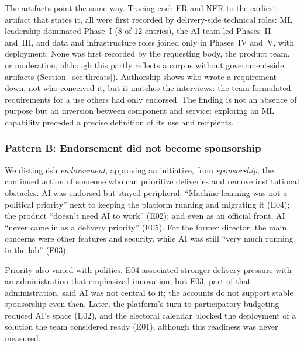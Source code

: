 \documentclass[sigconf,nonacm]{acmart}
\begin{document}
The artifacts point the same way. Tracing each FR and NFR to the earliest artifact that states it, all were first recorded by delivery-side technical roles: ML leadership dominated Phase~I (8 of 12 entries), the AI team led Phases~II and~III, and data and infrastructure roles joined only in Phases~IV and~V, with deployment. None was first recorded by the requesting body, the product team, or moderation, although this partly reflects a corpus without government-side artifacts (Section~\ref{sec:threats}). Authorship shows who wrote a requirement down, not who conceived it, but it matches the interviews: the team formulated requirements for a use others had only endorsed. The finding is not an absence of purpose but an inversion between component and service: exploring an ML capability preceded a precise definition of its use and recipients.


\subsubsection{Pattern B: Endorsement did not become sponsorship}
\label{sec:pb}

We distinguish \emph{endorsement}, approving an initiative, from \emph{sponsorship}, the continued action of someone who can prioritize deliveries and remove institutional obstacles. AI was endorsed but stayed peripheral. ``Machine learning was not a political priority'' next to keeping the platform running and migrating it (E04); the product ``doesn't need AI to work'' (E02); and even as an official front, AI ``never came in as a delivery priority'' (E05). For the former director, the main concerns were other features and security, while AI was still ``very much running in the lab'' (E03).

Priority also varied with politics. E04 associated stronger delivery pressure with an administration that emphasized innovation, but E03, part of that administration, said AI was not central to it; the accounts do not support stable sponsorship even then. Later, the platform's turn to participatory budgeting reduced AI's space (E02), and the electoral calendar blocked the deployment of a solution the team considered ready (E01), although this readiness was never measured.
\end{document}
